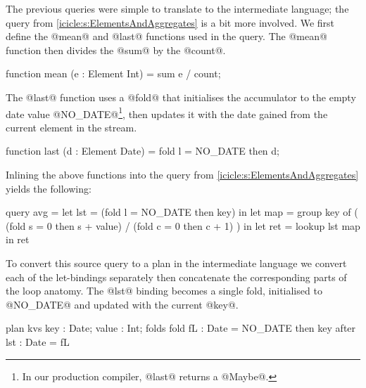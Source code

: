 The previous queries were simple to translate to the intermediate language; the query from \cref{icicle:s:ElementsAndAggregates} is a bit more involved.
We first define the @mean@ and @last@ functions used in the query.
The @mean@ function then divides the @sum@ by the @count@.
\begin{icicle}
function mean (e : Element Int)
 = sum e / count;
\end{icicle}

The @last@ function uses a @fold@ that initialises the accumulator to the empty date value @NO_DATE@\footnote{In our production compiler, @last@ returns a @Maybe@.}, then updates it with the date gained from the current element in the stream.
\begin{icicle}
function last (d : Element Date)
 = fold l = NO_DATE then d;
\end{icicle}



Inlining the above functions into the query from \cref{icicle:s:ElementsAndAggregates} yields the following:
\begin{icicle}
query avg
 =    let lst = (fold l = NO_DATE then key)
   in let map = group key of
                ( (fold s = 0 then s + value)
                / (fold c = 0 then c + 1) )
   in let ret = lookup lst map
   in     ret
\end{icicle}

To convert this source query to a plan in the intermediate language we convert each of the let-bindings separately then concatenate the corresponding parts of the loop anatomy.
The @lst@ binding becomes a single fold, initialised to @NO_DATE@ and updated with the current @key@.
\begin{icicle-core}
plan kvs {      key : Date; value : Int;       }
folds    { fold fL  : Date = NO_DATE then key  }
after    {      lst : Date = fL                }
\end{icicle-core}

